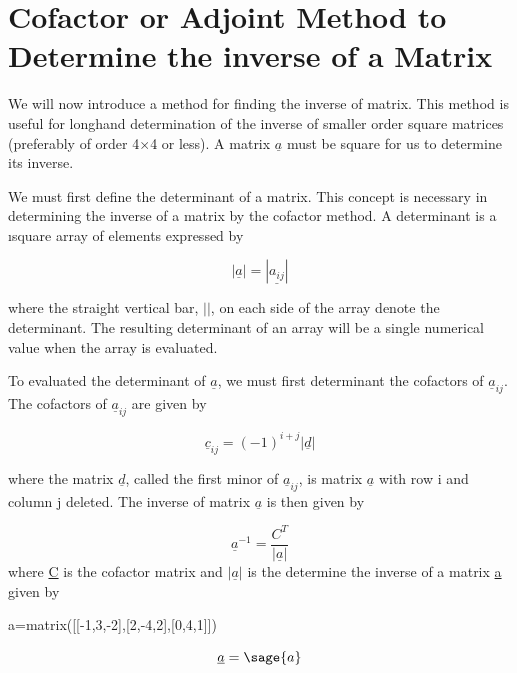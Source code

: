 \documentclass[12pt]{report}
\begin{document}
\section{Cofactor or Adjoint Method to Determine the inverse of a Matrix}

We will now introduce a method for finding the inverse of matrix. This
method is useful for longhand determination of the inverse of smaller
order square matrices (preferably of order 4$\times$4 or less). A
matrix $\underline{a}$ must be square for us to determine its inverse.


We must first define the determinant of a matrix. This concept is
necessary in determining the inverse of a matrix by the cofactor
method. A determinant is a \i{square array of elements expressed by}

\begin{equation}
	|\underline {a}| = |\underline{a_{ij}}|
\end{equation}

where the straight vertical bar, $| |$, on each side of the array denote
the determinant. The resulting determinant of an array will be a
single numerical value when the array is evaluated.

To evaluated the determinant of
$\underline{a}$, we must first determinant the
cofactors of $\underline{a}_{ij}$.
The cofactors of $\underline{a}_{ij}$ are given by

\begin{equation}
	\underline{c}_{ij}=(-1)^{i+j} |\underline{d}|
\end{equation}

where the matrix $\underline{d}$, called the first minor of
 $\underline{a}_{ij}$, is matrix $\underline{a}$ with row 
i and column j deleted. The inverse of matrix
$\underline{a}$ is then given by

\begin{equation}
	\underline{a}^{-1}=\frac{C^{T}}{|\underline{a}|}
	\label{eq:cofinverse}
\end{equation}
where \underline{C} is the cofactor matrix and $|\underline{a}|$ is the determine the inverse of a matrix \underline{a} given by 
\begin{sagesilent}
	a=matrix([[-1,3,-2],[2,-4,2],[0,4,1]])
\end{sagesilent}

\begin{equation}
	\underline{a} = \sage{a} 
\end{equation}
\end{document}
